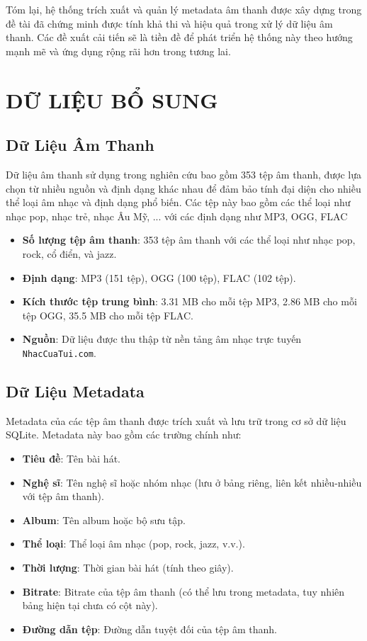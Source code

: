 \documentclass[conference]{IEEEtran}
\begin{document}
Tóm lại, hệ thống trích xuất và quản lý metadata âm thanh được xây dựng trong đề tài đã chứng minh được tính khả thi và hiệu quả trong xử lý dữ liệu âm thanh. Các đề xuất cải tiến sẽ là tiền đề để phát triển hệ thống này theo hướng mạnh mẽ và ứng dụng rộng rãi hơn trong tương lai.

\section{DỮ LIỆU BỔ SUNG}

\subsection{Dữ Liệu Âm Thanh}
Dữ liệu âm thanh sử dụng trong nghiên cứu bao gồm 353 tệp âm thanh, được lựa chọn từ nhiều nguồn và định dạng khác nhau để đảm bảo tính đại diện cho nhiều thể loại âm nhạc và định dạng phổ biến. Các tệp này bao gồm các thể loại như nhạc pop, nhạc trẻ, nhạc Âu Mỹ, ... với các định dạng như MP3, OGG, FLAC
\begin{itemize}
    \item \textbf{Số lượng tệp âm thanh}: 353 tệp âm thanh với các thể loại như nhạc pop, rock, cổ điển, và jazz.
    \item \textbf{Định dạng}: MP3 (151 tệp), OGG (100 tệp), FLAC (102 tệp).
    \item \textbf{Kích thước tệp trung bình}: 3.31 MB cho mỗi tệp MP3, 2.86 MB cho mỗi tệp OGG, 35.5 MB cho mỗi tệp FLAC.
    \item \textbf{Nguồn}: Dữ liệu được thu thập từ nền tảng âm nhạc trực tuyến \texttt{NhacCuaTui.com}.
\end{itemize}

\subsection{Dữ Liệu Metadata}
Metadata của các tệp âm thanh được trích xuất và lưu trữ trong cơ sở dữ liệu SQLite. Metadata này bao gồm các trường chính như:

\begin{itemize}
    \item \textbf{Tiêu đề}: Tên bài hát.
    \item \textbf{Nghệ sĩ}: Tên nghệ sĩ hoặc nhóm nhạc (lưu ở bảng riêng, liên kết nhiều-nhiều với tệp âm thanh).
    \item \textbf{Album}: Tên album hoặc bộ sưu tập.
    \item \textbf{Thể loại}: Thể loại âm nhạc (pop, rock, jazz, v.v.).
    \item \textbf{Thời lượng}: Thời gian bài hát (tính theo giây).
    \item \textbf{Bitrate}: Bitrate của tệp âm thanh (có thể lưu trong metadata, tuy nhiên bảng hiện tại chưa có cột này).
    \item \textbf{Đường dẫn tệp}: Đường dẫn tuyệt đối của tệp âm thanh.
\end{itemize}
\end{document}
